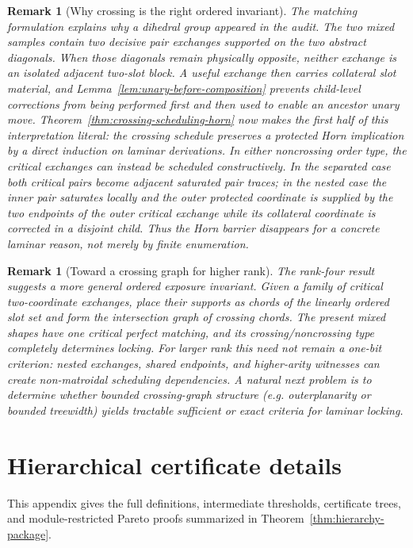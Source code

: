 \documentclass[11pt]{article}
\newtheorem{remark}[definition]{Remark}
\begin{document}
\begin{remark}[Why crossing is the right ordered invariant]
The matching formulation explains why a dihedral group appeared in the audit.
The two mixed samples contain two decisive pair exchanges supported on the two
abstract diagonals.  When those diagonals remain physically opposite, neither
exchange is an isolated adjacent two-slot block.  A useful exchange then carries
collateral slot material, and Lemma~\ref{lem:unary-before-composition} prevents
child-level corrections from being performed first and then used to enable an
ancestor unary move.  Theorem~\ref{thm:crossing-scheduling-horn} now makes the first half of this
interpretation literal: the crossing schedule preserves a protected Horn
implication by a direct induction on laminar derivations.  In either
noncrossing order type, the critical exchanges can instead be scheduled
constructively.  In the separated case both critical pairs become adjacent
saturated pair traces; in the nested case the inner pair saturates locally and
the outer protected coordinate is supplied by the two endpoints of the outer
critical exchange while its collateral coordinate is corrected in a disjoint
child.  Thus the Horn barrier disappears for a concrete laminar reason, not
merely by finite enumeration.
\end{remark}

\begin{remark}[Toward a crossing graph for higher rank]
The rank-four result suggests a more general ordered exposure invariant.  Given
a family of critical two-coordinate exchanges, place their supports as chords
of the linearly ordered slot set and form the intersection graph of crossing
chords.  The present mixed shapes have one critical perfect matching, and its
crossing/noncrossing type completely determines locking.  For larger rank this
need not remain a one-bit criterion: nested exchanges, shared endpoints, and
higher-arity witnesses can create non-matroidal scheduling dependencies.  A
natural next problem is to determine whether bounded crossing-graph structure
(e.g. outerplanarity or bounded treewidth) yields tractable sufficient or exact
criteria for laminar locking.
\end{remark}



\section{Hierarchical certificate details}
\label{app:hierarchy-details}
This appendix gives the full definitions, intermediate thresholds, certificate
trees, and module-restricted Pareto proofs summarized in
Theorem~\ref{thm:hierarchy-package}.
\end{document}

